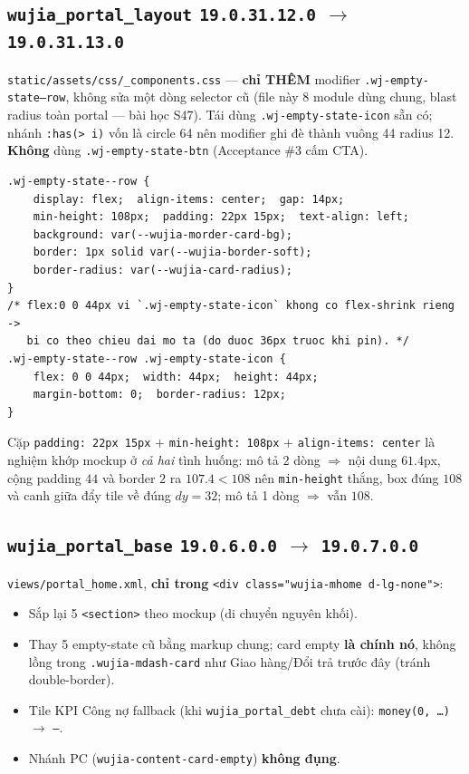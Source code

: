 \subsection{\texttt{wujia\_portal\_layout} \texttt{19.0.31.12.0} $\rightarrow$ \texttt{19.0.31.13.0}}

\texttt{static/assets/css/\_components.css} --- \textbf{chỉ THÊM} modifier
\texttt{.wj-empty-state--row}, không sửa một dòng selector cũ (file này 8 module dùng chung,
blast radius toàn portal --- bài học S47). Tái dùng \texttt{.wj-empty-state-icon} sẵn có; nhánh
\texttt{:has(> i)} vốn là circle 64 nên modifier ghi đè thành vuông 44 radius 12. \textbf{Không}
dùng \texttt{.wj-empty-state-btn} (Acceptance \#3 cấm CTA).

\begin{lstlisting}
.wj-empty-state--row {
    display: flex;  align-items: center;  gap: 14px;
    min-height: 108px;  padding: 22px 15px;  text-align: left;
    background: var(--wujia-morder-card-bg);
    border: 1px solid var(--wujia-border-soft);
    border-radius: var(--wujia-card-radius);
}
/* flex:0 0 44px vi `.wj-empty-state-icon` khong co flex-shrink rieng ->
   bi co theo chieu dai mo ta (do duoc 36px truoc khi pin). */
.wj-empty-state--row .wj-empty-state-icon {
    flex: 0 0 44px;  width: 44px;  height: 44px;
    margin-bottom: 0;  border-radius: 12px;
}
\end{lstlisting}

Cặp \texttt{padding: 22px 15px} $+$ \texttt{min-height: 108px} $+$ \texttt{align-items: center}
là nghiệm khớp mockup ở \emph{cả hai} tình huống: mô tả 2 dòng $\Rightarrow$ nội dung $61.4$px,
cộng padding $44$ và border $2$ ra $107.4 < 108$ nên \texttt{min-height} thắng, box đúng $108$ và
canh giữa đẩy tile về đúng $dy=32$; mô tả 1 dòng $\Rightarrow$ vẫn $108$.

\subsection{\texttt{wujia\_portal\_base} \texttt{19.0.6.0.0} $\rightarrow$ \texttt{19.0.7.0.0}}

\texttt{views/portal\_home.xml}, \textbf{chỉ trong} \texttt{<div class="wujia-mhome d-lg-none">}:

\begin{itemize}
  \item Sắp lại 5 \texttt{<section>} theo mockup (di chuyển nguyên khối).
  \item Thay 5 empty-state cũ bằng markup chung; card empty \textbf{là chính nó}, không lồng
    trong \texttt{.wujia-mdash-card} như Giao hàng/Đổi trả trước đây (tránh double-border).
  \item Tile KPI Công nợ fallback (khi \texttt{wujia\_portal\_debt} chưa cài):
    \texttt{money(0, \ldots)} $\rightarrow$ \texttt{---}.
  \item Nhánh PC (\texttt{wujia-content-card-empty}) \textbf{không đụng}.
\end{itemize}

